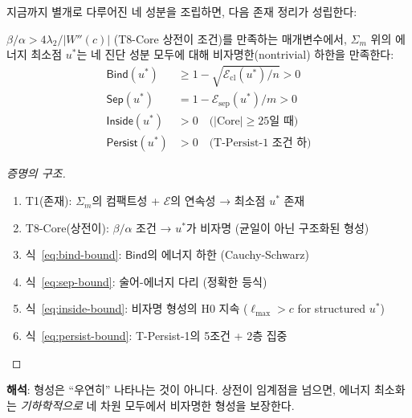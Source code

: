 지금까지 별개로 다루어진 네 성분을 조립하면, 다음 존재 정리가 성립한다:

\begin{theorem}[원시-응집 존재]
\label{thm:proto-cohesion-existence}
$\beta/\alpha > 4\lambda_2/|W''(c)|$ (T8-Core 상전이 조건)를 만족하는 매개변수에서, $\Sigma_m$ 위의 에너지 최소점 $u^*$는 네 진단 성분 모두에 대해 비자명한(nontrivial) 하한을 만족한다:
\begin{align}
    \mathsf{Bind}(u^*) &\geq 1 - \sqrt{\mathcal{E}_{\mathrm{cl}}(u^*)/n} > 0 \label{eq:bind-bound} \\
    \mathsf{Sep}(u^*) &= 1 - \mathcal{E}_{\mathrm{sep}}(u^*)/m > 0 \label{eq:sep-bound} \\
    \mathsf{Inside}(u^*) &> 0 \quad \text{($|\mathrm{Core}| \geq 25$일 때)} \label{eq:inside-bound} \\
    \mathsf{Persist}(u^*) &> 0 \quad \text{(T-Persist-1 조건 하)} \label{eq:persist-bound}
\end{align}
\end{theorem}

\begin{proof}[증명의 구조]
\begin{enumerate}
    \item T1(존재): $\Sigma_m$의 컴팩트성 + $\mathcal{E}$의 연속성 → 최소점 $u^*$ 존재
    \item T8-Core(상전이): $\beta/\alpha$ 조건 → $u^*$가 비자명 (균일이 아닌 구조화된 형성)
    \item 식~\eqref{eq:bind-bound}: $\mathsf{Bind}$의 에너지 하한 (Cauchy-Schwarz)
    \item 식~\eqref{eq:sep-bound}: 술어-에너지 다리 (정확한 등식)
    \item 식~\eqref{eq:inside-bound}: 비자명 형성의 H0 지속 ($\ell_{\max} > c$ for structured $u^*$)
    \item 식~\eqref{eq:persist-bound}: T-Persist-1의 5조건 + 2층 집중
\end{enumerate}
\end{proof}

\textbf{해석}: 형성은 ``우연히'' 나타나는 것이 아니다. 상전이 임계점을 넘으면, 에너지 최소화는 \emph{기하학적으로} 네 차원 모두에서 비자명한 형성을 보장한다.

\begin{center}
\end{center}

